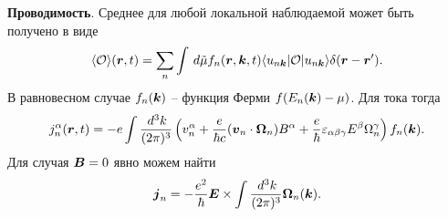 \textbf{Проводимость}. Среднее для любой локальной наблюдаемой может быть получено в виде
\begin{align*}
	\langle \mathcal O\rangle(\boldsymbol{r}, t) = \sum_n \int \, d \tilde{\mu} f_n (\boldsymbol{r}, \boldsymbol{k}, t) \langle u_{n \boldsymbol{k}}| \mathcal O | u_{n \boldsymbol{k}}\rangle \delta(\boldsymbol{r}-\boldsymbol{r}')
	.
\end{align*}
В равновесном случае $f_n(\boldsymbol{k})$ -- функция Ферми $f(E_n(\boldsymbol{k}) - \mu)$. Для тока тогда
\begin{equation*}
	j^\alpha_n (\boldsymbol{r}, t) = -e \int  \frac{\, d^3 k}{(2\pi)^3} \left(
		v_n^\alpha + \frac{e}{\hbar c} (\boldsymbol{v}_n \cdot \boldsymbol{\Omega}_n) B^\alpha + \frac{e}{\hbar} \varepsilon_{\alpha \beta \gamma} E^\beta \Omega_n^\gamma
	\right) f_n (\boldsymbol{k}).
\end{equation*}
Для случая $\boldsymbol{B} = 0$ явно можем найти
\begin{equation*}
	\boldsymbol{j}_n = -\frac{e^2}{\hbar} \boldsymbol{E} \times \int \frac{\, d^3 k}{(2\pi)^3} \boldsymbol{\Omega}_n (\boldsymbol{k}).
\end{equation*}
